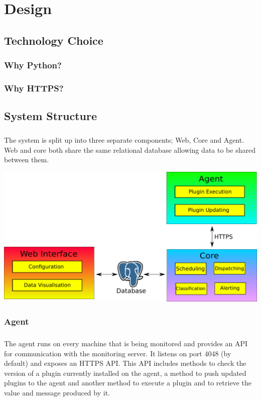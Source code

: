 \documentclass[bsc,logo,twoside]{infthesis}
\begin{document}
	
\chapter{Design}
\section{Technology Choice}
\subsection{Why Python?}
\subsection{Why HTTPS?}

\section{System Structure}
\paragraph*{}
	The system is split up into three separate components; Web, Core and Agent.
	Web and core both share the same relational database allowing data to be
	shared between them.
	

\includegraphics[scale=0.5]{assets/system_structure.pdf}

		
\subsection{Agent}
\paragraph*{}
	The agent runs on every machine that is being monitored and provides an API
	for communication with the monitoring server.  It listens on port 4048 (by
	default) and exposes an HTTPS API.  This API includes methods to check the
	version of a plugin currently installed on the agent, a method to push updated
	plugins to the agent and another method to execute a plugin and to retrieve
	the value and message produced by it.
	
\end{document}
